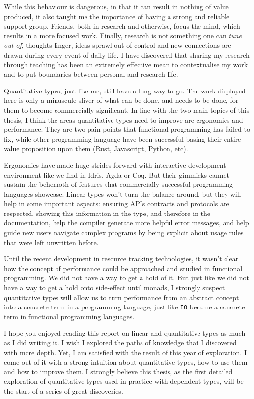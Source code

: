 \documentclass[
]{article}
\begin{document}
While this behaviour is dangerous, in that it can result in nothing of
value produced, it also taught me the importance of having a strong and
reliable support group. Friends, both in research and otherwise, focus
the mind, which results in a more focused work. Finally, research is not
something one can \emph{tune out of}, thoughts linger, ideas sprawl out
of control and new connections are drawn during every event of daily
life. I have discovered that sharing my research through teaching has
been an extremely effective mean to contextualise my work and to put
boundaries between personal and research life.

Quantitative types, just like me, still have a long way to go. The work
displayed here is only a minuscule sliver of what can be done, and needs
to be done, for them to become commercially significant. In line with
the two main topics of this thesis, I think the areas quantitative types
need to improve are ergonomics and performance. They are two pain points
that functional programming has failed to fix, while other programming
language have been successful basing their entire value proposition upon
them (Rust, Javascript, Python, etc).

Ergonomics have made huge strides forward with interactive development
environment like we find in Idris, Agda or Coq. But their gimmicks
cannot sustain the behemoth of features that commercially successful
programming languages showcase. Linear types won't turn the balance
around, but they will help in some important aspects: ensuring APIs
contracts and protocols are respected, showing this information in the
type, and therefore in the documentation, help the compiler generate
more helpful error messages, and help guide new users navigate complex
programs by being explicit about usage rules that were left unwritten
before.

Until the recent development in resource tracking technologies, it
wasn't clear how the concept of performance could be approached and
studied in functional programming. We did not have a way to get a hold
of it. But just like we did not have a way to get a hold onto
side-effect until monads, I strongly suspect quantitative types will
allow us to turn performance from an abstract concept into a concrete
term in a programming language, just like \texttt{IO} became a concrete
term in functional programming languages.

I hope you enjoyed reading this report on linear and quantitative types
as much as I did writing it. I wish I explored the paths of knowledge
that I discovered with more depth. Yet, I am satisfied with the result
of this year of exploration. I come out of it with a strong intuition
about quantitative types, how to use them and how to improve them. I
strongly believe this thesis, as the first detailed exploration of
quantitative types used in practice with dependent types, will be the
start of a series of great discoveries.
\end{document}
